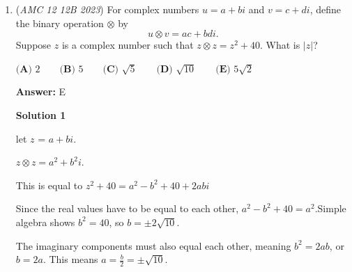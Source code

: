 \begin{enumerate}
 
 \[\frac{x+2x}{2}\cdot\sqrt{1-\frac{x^2}{4}} = m\]
 \[\frac{9x^2}{4}\cdot\frac{4-x^2}{4} = m^2\]
 \[-9x^4 + 36x^2 = 16m^2.\]

 The maximum value of this quartic occurs at $x^2 = \frac{-36}{2(-9)} = 2$, or when $x = \sqrt{2}.$

 It follows that the area of the trapezoid is equal to 

 
 \[\frac{3\sqrt{2}}{2}\cdot\frac{1}{\sqrt{2}} = \boxed{\text{(D) }\frac{3}{2}}.\]

 -Benedict T (countmath1)

 



\textbf{Solution 6 (Time Crunch)}

It can be guessed that the angle between the legs and the longer base of the trapezoid is $45^\circ,$ as maximizing area often occurs when horizontal and vertical components are equal. Since each leg has length $1,$ the horizontal projection and vertical height would both be $\frac{\sqrt{2}}{2}.$ Therefore, the shorter and longer base would be $\sqrt{2}$ and $2\sqrt{2}$ respectively. The area of the trapezoid would then be

 
 \[\frac{\sqrt{2}+2\sqrt{2}}{2}\cdot\frac{\sqrt{2}}{2}=\boxed{\frac{3}{2}}.\]



	\item (\textit{AMC 12 12B 2023}) For complex numbers $u=a+bi$ and $v=c+di$, define the binary operation $\otimes$ by
 \[u\otimes v=ac+bdi.\]Suppose $z$ is a complex number such that $z\otimes z=z^{2}+40$. What is $|z|$?


 $\textbf{(A) }2\qquad\textbf{(B) }5\qquad\textbf{(C) }\sqrt{5}\qquad\textbf{(D) }\sqrt{10}\qquad\textbf{(E) }5\sqrt{2}$

 \textbf{Answer: }E



\textbf{Solution 1}

let $z$ = $a+bi$.

 $z \otimes z = a^{2}+b^{2}i$.

 This is equal to $z^{2} + 40 = a^{2}-b^{2}+40+2abi$

 Since the real values have to be equal to each other, $a^{2}-b^{2}+40 = a^{2}$.Simple algebra shows $b^{2} = 40$, so $b = \pm 2\sqrt{10}$.

 The imaginary components must also equal each other, meaning $b^{2} = 2ab$, or $b = 2a$. This means $a = \frac{b}{2} = \pm \sqrt{10}$.


\end{enumerate}
